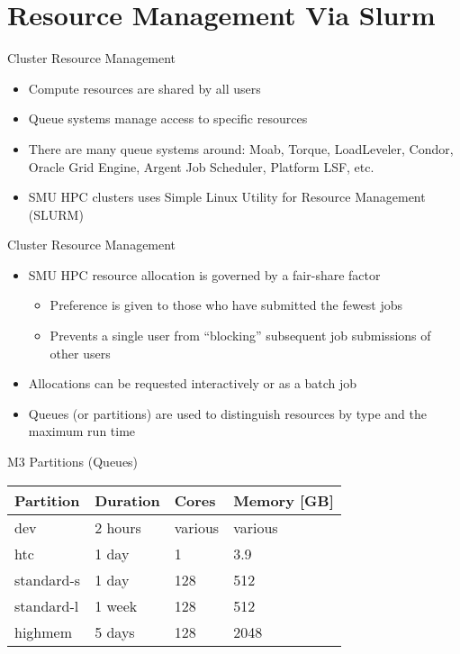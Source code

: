 \section{Resource Management Via Slurm}

\begin{frame}{Cluster Resource Management}
\begin{itemize}
\item Compute resources are shared by all users
\item Queue systems manage access to specific resources
\item There are many queue systems around: Moab, Torque, LoadLeveler, Condor,
      Oracle Grid Engine, Argent Job Scheduler, Platform LSF, etc.
\item SMU HPC clusters uses Simple Linux Utility for Resource Management
      (SLURM)
\end{itemize}
\end{frame}

\begin{frame}{Cluster Resource Management}
\begin{itemize}
\item SMU HPC resource allocation is governed by a fair-share factor
\begin{itemize}
\item Preference is given to those who have submitted the fewest jobs
\item Prevents a single user from “blocking” subsequent job submissions of
      other users
\end{itemize}
\item Allocations can be requested interactively or as a batch job
\item Queues (or partitions) are used to distinguish resources by type and the
      maximum run time
\end{itemize}
\end{frame}

\begin{frame}{M3 Partitions (Queues)}
\begin{table}
\scriptsize
\begin{tabular}{llll}
\toprule
Partition & Duration & Cores & Memory [GB]\\
\midrule
dev & 2 hours & various & various\\
htc & 1 day & 1 & 3.9\\
standard-s & 1 day & 128 & 512\\
standard-l & 1 week & 128 & 512\\
highmem & 5 days & 128 & 2048\\
\bottomrule
\end{tabular}
\end{table}
\end{frame}

